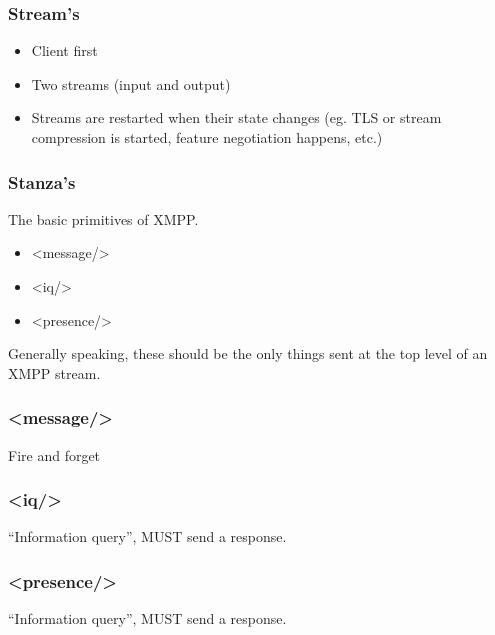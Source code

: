 \documentclass[xelatex]{beamer}
\newcommand*{\stanza}[1]{\textless #1/\textgreater}
\begin{document}
	\begin{frame}
		\frametitle{Stream's}
		\begin{itemize}
			\item Client first
			\item Two streams (input and output)
			\item Streams are restarted when their state changes (eg. TLS or stream
				compression is started, feature negotiation happens, etc.)
		\end{itemize}
	\end{frame}

	\begin{frame}
		\frametitle{Stanza's}
		The basic primitives of XMPP.
		\begin{itemize}
			\item \stanza{message}
			\item \stanza{iq}
			\item \stanza{presence}
		\end{itemize}

		Generally speaking, these should be the only things sent at the top level of
		an XMPP stream.
	\end{frame}

	\begin{frame}
		\frametitle{\stanza{message}}
		Fire and forget
	\end{frame}

	\begin{frame}
		\frametitle{\stanza{iq}}
		``Information query'', MUST send a response.
	\end{frame}

	\begin{frame}
		\frametitle{\stanza{presence}}
		``Information query'', MUST send a response.
	\end{frame}
\end{document}
